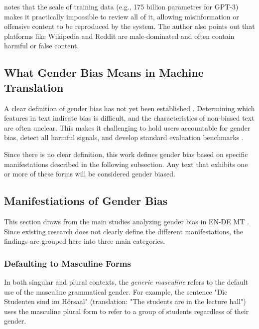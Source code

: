 \citet{ullmannGenderBiasMachine2022} notes that the scale of training data (e.g., 175 billion parametres for GPT-3) makes it practically impossible to review all of it, allowing misinformation or offensive content to be reproduced by the system. The author also points out that platforms like Wikipedia and Reddit are male-dominated and often contain harmful or false content.

\subsection{What Gender Bias Means in Machine Translation}\label{subsection:what_is_gb}

A clear definition of gender bias has not yet been established \citep{stanczakSurveyGenderBias2021}. Determining which features in text indicate bias is difficult, and the characteristics of non-biased text are often unclear. This makes it challenging to hold users accountable for gender bias, detect all harmful signals, and develop standard evaluation benchmarks \citep{barclayInvestigatingMarkersDrivers2024a,shresthaExploringGenderBiases2022,stanczakSurveyGenderBias2021}. 

Since there is no clear definition, this work defines gender bias based on specific manifestations described in the following subsection. Any text that exhibits one or more of these forms will be considered gender biased.

\subsection{Manifestiations of Gender Bias} \label{subsection:manifestations_of_gb}
This section draws from the main studies analyzing gender bias in EN-DE MT \citep{ullmannGenderBiasMachine2022,rescignoGenderBiasMachine2023,lardelliBuildingBridgesDataset2024,kapplAreAllSpanish2025}. Since existing research does not clearly define the different manifestations, the findings are grouped here into three main categories.

\subsubsection{Defaulting to Masculine Forms}
In both singular and plural contexts, the \textit{generic masculine} refers to the default use of the masculine grammatical gender.
For example, the sentence "Die Studenten sind im Hörsaal" (translation: "The students are in the lecture hall") uses the masculine plural form to refer to a group of students regardless of their gender.

